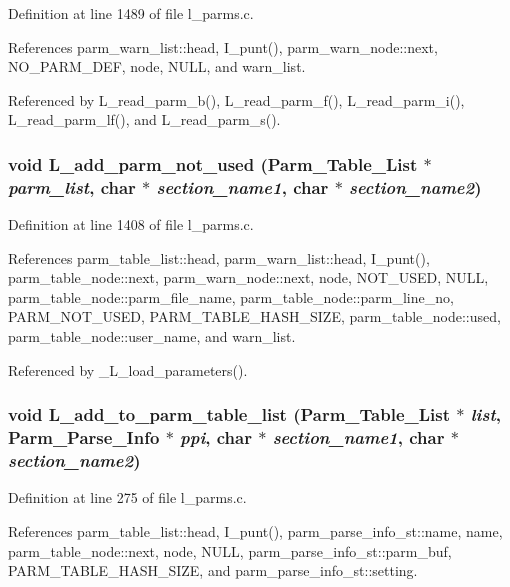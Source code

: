 Definition at line 1489 of file l\_\-parms.c.

References parm\_\-warn\_\-list::head, I\_\-punt(), parm\_\-warn\_\-node::next, NO\_\-PARM\_\-DEF, node, NULL, and warn\_\-list.

Referenced by L\_\-read\_\-parm\_\-b(), L\_\-read\_\-parm\_\-f(), L\_\-read\_\-parm\_\-i(), L\_\-read\_\-parm\_\-lf(), and L\_\-read\_\-parm\_\-s().
\subsubsection{\setlength{\rightskip}{0pt plus 5cm}void L\_\-add\_\-parm\_\-not\_\-used (\bf{Parm\_\-Table\_\-List} $\ast$ {\em parm\_\-list}, char $\ast$ {\em section\_\-name1}, char $\ast$ {\em section\_\-name2})}\label{l__parms_8c_e48a84c9930f422e28906cecb4240390}




Definition at line 1408 of file l\_\-parms.c.

References parm\_\-table\_\-list::head, parm\_\-warn\_\-list::head, I\_\-punt(), parm\_\-table\_\-node::next, parm\_\-warn\_\-node::next, node, NOT\_\-USED, NULL, parm\_\-table\_\-node::parm\_\-file\_\-name, parm\_\-table\_\-node::parm\_\-line\_\-no, PARM\_\-NOT\_\-USED, PARM\_\-TABLE\_\-HASH\_\-SIZE, parm\_\-table\_\-node::used, parm\_\-table\_\-node::user\_\-name, and warn\_\-list.

Referenced by \_\-L\_\-load\_\-parameters().
\subsubsection{\setlength{\rightskip}{0pt plus 5cm}void L\_\-add\_\-to\_\-parm\_\-table\_\-list (\bf{Parm\_\-Table\_\-List} $\ast$ {\em list}, \bf{Parm\_\-Parse\_\-Info} $\ast$ {\em ppi}, char $\ast$ {\em section\_\-name1}, char $\ast$ {\em section\_\-name2})}\label{l__parms_8c_68767fcc02492c969cdc624ed22854fe}




Definition at line 275 of file l\_\-parms.c.

References parm\_\-table\_\-list::head, I\_\-punt(), parm\_\-parse\_\-info\_\-st::name, name, parm\_\-table\_\-node::next, node, NULL, parm\_\-parse\_\-info\_\-st::parm\_\-buf, PARM\_\-TABLE\_\-HASH\_\-SIZE, and parm\_\-parse\_\-info\_\-st::setting.

